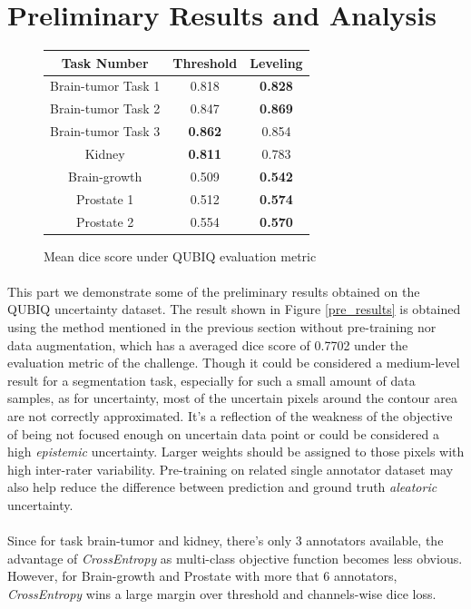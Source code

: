 \documentclass[12pt]{extarticle}
\begin{document}
\section{Preliminary Results and Analysis}
\begin{figure}[ht!]
\begin{center}
    \begin{tabular}{|| c | c | c ||}
       \hline
       Task Number & Threshold & Leveling \\
       \hline \hline
        Brain-tumor Task 1 & 0.818 & \textbf{0.828} \\
        Brain-tumor Task 2 & 0.847 & \textbf{0.869}\\
        Brain-tumor Task 3 & \textbf{0.862} & 0.854\\
        Kidney & \textbf{0.811} & 0.783 \\
        Brain-growth & 0.509 & \textbf{0.542}  \\
        Prostate 1 & 0.512 & \textbf{0.574} \\
        Prostate 2 & 0.554 & \textbf{0.570} \\
        \hline \hline
    \end{tabular}
\end{center}
\caption{Mean dice score under QUBIQ evaluation metric}
\end{figure}
\paragraph{}
This part we demonstrate some of the preliminary results obtained on the QUBIQ uncertainty dataset.
The result shown in Figure \ref{pre_results} is obtained using the method mentioned in the previous 
section without pre-training nor data augmentation, which has 
a averaged dice score of 0.7702 under the evaluation metric of the challenge. 
Though it could be considered a medium-level result for a segmentation task, especially for such
a small amount of data samples, as for uncertainty, most of the uncertain pixels around the contour area are not 
correctly approximated. It's a reflection of the weakness of the objective of 
being not focused enough on uncertain data point or could be considered a high \textit{epistemic} uncertainty. 
Larger weights should be assigned to those pixels with high inter-rater variability. Pre-training on 
related single annotator dataset may also help reduce the difference between 
prediction and ground truth \textit{aleatoric} uncertainty.
\paragraph{}
Since for task brain-tumor and kidney, there's only 3 annotators available, the advantage of \textit{CrossEntropy} as 
multi-class objective function becomes less obvious. However, for Brain-growth and Prostate with more that 6 annotators, \textit{CrossEntropy}
wins a large margin over threshold and channels-wise dice loss.
\end{document}
